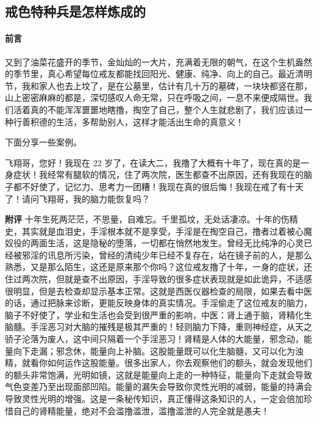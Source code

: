 \subsection{戒色特种兵是怎样炼成的}

\paragraph*{前言}

又到了油菜花盛开的季节，金灿灿的一大片，充满着无限的朝气，在这个生机盎然的季节里，真心希望每位戒友都能找回阳光、健康、纯净、向上的自己。最近清明节，我和家人也去上坟了，是在公墓里，估计有几十万的墓碑，一块块都竖在那，山上密密麻麻的都是，深切感叹人命无常，只在呼吸之间，一息不来便成隔世。我们活着真的不能浑浑噩噩地瞎撸，掏空了自己，整个人生就悲剧了，我们应该过一种行善积德的生活，多帮助别人，这样才能活出生命的真意义！

下面分享一些案例。

\begin{case}
    飞翔哥，您好！我现在 22 岁了，在读大二，我撸了大概有十年了，现在真的是一身症状！我经常有腿软的情况，住了两次院，医生都查不出原因，还有我现在的脑子都不好使了，记忆力、思考力一团糟！我现在真的很后悔！我现在戒了有十天了！请问飞翔哥，我的脑力能恢复吗？

    \textbf{附评} 十年生死两茫茫，不思量，自难忘。千里孤坟，无处话凄凉。十年的伤精史，其实就是血泪史，手淫根本就不是享受，手淫是在掏空自己，撸者过着被心魔奴役的两面生活，这是隐秘的堕落，一切都在悄然地发生。曾经无比纯净的心灵已经被邪淫的讯息所污染，曾经的清纯少年已经不复存在，站在镜子前的人，是那么熟悉，又是那么陌生，这还是原来那个你吗？这位戒友撸了十年，一身的症状，还住过两次院，但就是查不出原因，手淫导致的很多症状表现就是如此诡异，不适感很明显，但是去检查却显示基本正常。这就是西医仪器检查的局限，如果去看中医的话，通过把脉来诊断，更能反映身体的真实情况。手淫偷走了这位戒友的脑力，脑子不好使了，学业和生活也会受到很严重的影响，中医：肾上通于脑，肾精化生脑髓。手淫恶习对大脑的摧残是极其严重的！轻则脑力下降，重则神经症，从天之骄子沦落为废人，这中间只隔着一个手淫恶习！肾精是人体的大能量，邪念动，能量向下走漏；邪念休，能量向上补脑。这股能量既可以化生脑髓，又可以化为浊精，就看你如何运作这股能量。很多出家人，你去观察他们的额头，就会发现他们的额头非常饱满，光明如镜，这就是能量向上走的一种特征，能量向下走就会导致气色变差乃至出现面部凹陷。能量的漏失会导致你灵性光明的减弱，能量的持满会导致灵性光明的增强。这是一条秘传知识，真正懂得这条知识的人，一定会倍加珍惜自己的肾精能量，绝对不会滥撸滥泄，滥撸滥泄的人完全就是愚夫！
\end{case}

